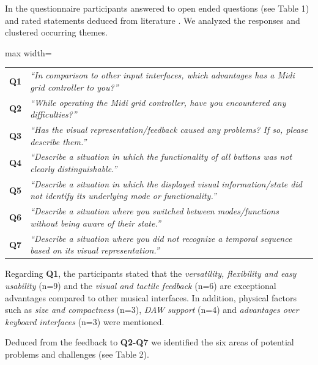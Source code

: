 \documentclass[sigconf]{nimeart}
\begin{document}
In the questionnaire participants answered to open ended questions (see Table 1) and rated statements deduced from literature \cite{Rossmy2021Musical}. We analyzed the responses and clustered occurring themes.

\begin{table}[htbp]\centering\small
\begin{adjustbox}{max width=\textwidth}\begin{tabular}{@{}ll@{}}

\toprule
\midrule

\textbf{Q1} & \emph{``In comparison to other input interfaces, which advantages has a Midi grid controller to you?''} \\
\textbf{Q2} & \emph{``While operating the Midi grid controller, have you encountered any difficulties?''} \\
\textbf{Q3} & \emph{``Has the visual representation/feedback caused any problems? If so, please describe them.''} \\
\textbf{Q4} & \emph{``Describe a situation in which the functionality of all buttons was not clearly distinguishable.''} \\
\textbf{Q5} & \emph{``Describe a situation in which the displayed visual information/state did not identify its underlying mode or functionality.''} \\
\textbf{Q6} & \emph{``Describe a situation where you switched between modes/functions without being aware of their state.''} \\
\textbf{Q7} & \emph{``Describe a situation where you did not recognize a temporal sequence based on its visual representation.''} \\
\bottomrule
\end{tabular}\end{adjustbox}\end{table}

Regarding \textbf{Q1}, the participants stated that the \emph{versatility, flexibility and easy usability} (n=9) and the \emph{visual and tactile feedback} (n=6) are exceptional advantages compared to other musical interfaces. In addition, physical factors such as \emph{size and compactness} (n=3), \emph{DAW support} (n=4) and \emph{advantages over keyboard interfaces} (n=3) were mentioned.

Deduced from the feedback to \textbf{Q2-Q7} we identified the six areas of potential problems and challenges (see Table 2).
\end{document}
